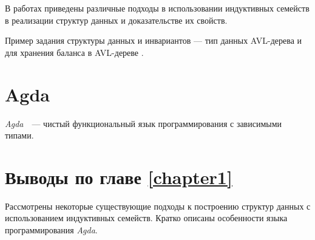 В работах \cite{HongweiXi, McBridePivotal} приведены различные подходы
в использовании индуктивных семейств в реализации структур данных
и доказательстве их свойств.

Пример задания структуры данных и инвариантов —
тип данных AVL-дерева и для хранения баланса в AVL-дереве \cite{AVLTree}.



\section{Agda}
\emph{Agda}~\cite{AgdaLang}~---  чистый функциональный язык программирования с зависимыми типами.


\section{Выводы по главе \ref{chapter1}}

Рассмотрены некоторые существующие подходы к построению структур данных
с использованием индуктивных семейств.
Кратко описаны особенности языка программирования \textit{Agda}.
